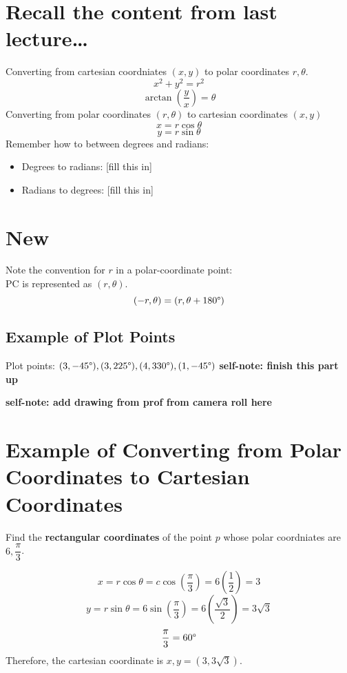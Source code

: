 \documentclass{article}
\begin{document}
\renewcommand{\familydefault}{\rmdefault}




\normalsize

\section*{Recall the content from last lecture\dots}
\begin{notebox}
Converting from cartesian coordniates \( (x, y) \) to polar coordinates \( r, \theta \).
\[
    x^2 + y^2 = r^2
\]
\[
    \arctan(\dfrac{y}{x}) = \theta
\]
Converting from polar coordinates \( (r, \theta) \) to cartesian coordinates \( (x, y) \) 
\[
    x = r\cos\theta
\]
\[
    y = r\sin\theta
\]
Remember how to between degrees and radians:
\begin{itemize}
    \item Degrees to radians: [fill this in]
    \item Radians to degrees: [fill this in]
\end{itemize}
\end{notebox}

\section*{New}
\begin{conceptbox}
Note the convention for \( r \) in a polar-coordinate point: \\
PC is represented as \( (r, \theta) \).
\[
    (-r, \theta) = (r, \theta + 180\text{\textdegree})
\]
\end{conceptbox}

\subsection*{Example of Plot Points}
\begin{examplebox}
Plot points: \( (3, -45\text{\textdegree}), (3, 225\text{\textdegree}), (4, 330\text{\textdegree}), (1, -45\text{\textdegree}) \)
\textbf{self-note: finish this part up}


\textbf{self-note: add drawing from prof from camera roll here}
\end{examplebox}

\section*{Example of Converting from Polar Coordinates to Cartesian Coordinates}
\begin{examplebox}
Find the \textbf{rectangular coordinates} of the point \( p \) whose polar coordniates are \( 6, \dfrac{\pi}{3}\).

\begin{solutionbox}
\[
    x = r\cos\theta = c\cos(\dfrac{\pi}{3}) = 6(\frac{1}{2}) = 3
\]
\[
    y = r\sin\theta=6\sin(\dfrac{\pi}{3}) = 6(\frac{\sqrt{3}}{2}) = 3\sqrt{3} 
\]
\[
    \frac{\pi}{3} = 60\text{\textdegree}
\]
Therefore, the cartesian coordinate is \( x, y = (3, 3\sqrt{3}) \).
\end{solutionbox}
\end{examplebox}
\end{document}
